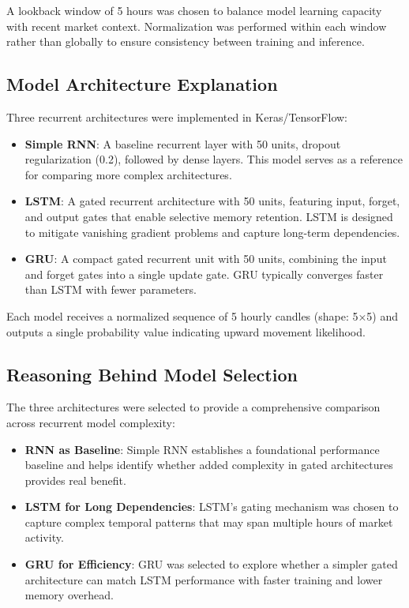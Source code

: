 \documentclass[conference]{IEEEtran}
\begin{document}
A lookback window of 5 hours was chosen to balance model learning capacity with recent market context. Normalization was performed within each window rather than globally to ensure consistency between training and inference.

\subsection{Model Architecture Explanation}
Three recurrent architectures were implemented in Keras/TensorFlow:

\begin{itemize}
    \item \textbf{Simple RNN}: A baseline recurrent layer with 50 units, dropout regularization (0.2), followed by dense layers. This model serves as a reference for comparing more complex architectures.
    
    \item \textbf{LSTM}: A gated recurrent architecture with 50 units, featuring input, forget, and output gates that enable selective memory retention. LSTM is designed to mitigate vanishing gradient problems and capture long-term dependencies.
    
    \item \textbf{GRU}: A compact gated recurrent unit with 50 units, combining the input and forget gates into a single update gate. GRU typically converges faster than LSTM with fewer parameters.
\end{itemize}

Each model receives a normalized sequence of 5 hourly candles (shape: 5×5) and outputs a single probability value indicating upward movement likelihood.

\subsection{Reasoning Behind Model Selection}
The three architectures were selected to provide a comprehensive comparison across recurrent model complexity:

\begin{itemize}
    \item \textbf{RNN as Baseline}: Simple RNN establishes a foundational performance baseline and helps identify whether added complexity in gated architectures provides real benefit.
    
    \item \textbf{LSTM for Long Dependencies}: LSTM's gating mechanism was chosen to capture complex temporal patterns that may span multiple hours of market activity.
    
    \item \textbf{GRU for Efficiency}: GRU was selected to explore whether a simpler gated architecture can match LSTM performance with faster training and lower memory overhead.
\end{itemize}
\end{document}
